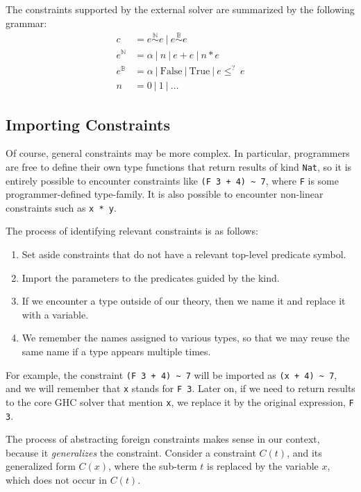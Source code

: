 \documentclass{sigplanconf}
\begin{document}
The constraints supported by the external solver are summarized by the
following grammar:
\begin{align*}
c & = e \overset {\mathbb{N}} \sim e ~|~  e \overset {\mathbb{B}} \sim e \\
e^\mathbb{N} & = \alpha ~|~ n ~|~ e + e ~|~ n * e \\
e^\mathbb{B} & = \alpha ~|~ \mathrm{False} ~|~ \mathrm{True} ~|~ e \leq^? ~e \\
n          & = 0 ~|~ 1 ~|~ \dots
\end{align*}


\subsection{Importing Constraints}

Of course, general constraints may be more complex.  In particular,
programmers are free to define their own type functions that return
results of kind \Verb"Nat", so it is entirely possible to encounter
constraints like \Verb"(F 3 + 4) ~ 7", where \Verb"F" is some programmer-defined
type-family.  It is also possible to encounter non-linear constraints such
as \Verb"x * y".

The process of identifying relevant constraints is as follows:
\begin{enumerate}
\item Set aside constraints that do not have a relevant top-level predicate
symbol.
\item Import the parameters to the predicates guided by the kind.
\item If we encounter a type outside of our theory, then we name it and replace
      it with a variable.
\item We remember the names assigned to various types, so that we may reuse
      the same name if a type appears multiple times.
\end{enumerate}

For example, the constraint \Verb"(F 3 + 4) ~ 7" will be imported as
\Verb"(x + 4) ~ 7", and we will remember that \Verb"x" stands for \Verb"F 3".
Later on, if we need to return results to the core GHC solver that mention
\Verb"x", we replace it by the original expression, \Verb"F 3".

The process of abstracting foreign constraints makes sense in our context,
because it {\em generalizes} the constraint.  Consider a constraint $C(t)$, and
its generalized form $C(x)$, where the sub-term $t$ is replaced by
the variable $x$, which does not occur in $C(t)$.
\end{document}
